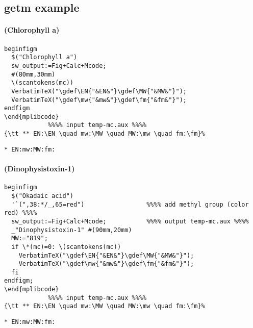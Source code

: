 \documentclass[a4paper]{article}
\begin{document}
\subsection{getm example}
\paragraph{(Chlorophyll a)}
\noindent%
\begin{verbatim}
beginfigm
  $("Chlorophyll a")
  sw_output:=Fig+Calc+Mcode;
  #(80mm,30mm)
  \(scantokens(mc))
  VerbatimTeX("\gdef\EN{"&EN&"}\gdef\MW{"&MW&"}");
  VerbatimTeX("\gdef\mw{"&mw&"}\gdef\fm{"&fm&"}");
endfigm
\end{mplibcode}
            %%%% input temp-mc.aux %%%%
{\tt ** EN:\EN \quad mw:\MW \quad MW:\mw \quad fm:\fm}%
\end{verbatim}
{\tt ** EN:\EN \quad mw:\MW \quad MW:\mw \quad fm:\fm}%
\paragraph{(Dinophysistoxin-1)}
\noindent%
\begin{verbatim}
beginfigm
  $("Okadaic acid")
  '`(",38:*/_,65=red")                 %%%% add methyl group (color red) %%%%
  sw_output:=Fig+Calc+Mcode;           %%%% output temp-mc.aux %%%%
  _"Dinophysistoxin-1" #(90mm,20mm)
  MW:="819";
  if \*(mc)=0: \(scantokens(mc))
    VerbatimTeX("\gdef\EN{"&EN&"}\gdef\MW{"&MW&"}");
    VerbatimTeX("\gdef\mw{"&mw&"}\gdef\fm{"&fm&"}");
  fi
endfigm;
\end{mplibcode}
            %%%% input temp-mc.aux %%%%
{\tt ** EN:\EN \quad mw:\MW \quad MW:\mw \quad fm:\fm}%
\end{verbatim}
{\tt ** EN:\EN \quad mw:\MW \quad MW:\mw \quad fm:\fm}%
\newpage
\end{document}
